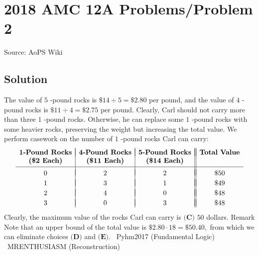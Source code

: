\documentclass[12pt]{article}
\begin{document}
\section*{{2018 AMC 12A Problems/Problem 2}}
Source: AoPS Wiki

\subsection*{Solution}
The value of $5$ -pound rocks is $\$14\div5=\$2.80$ per pound, and the value of $4$ -pound rocks is $\$11\div4=\$2.75$ per pound. Clearly, Carl should not carry more than three $1$ -pound rocks. Otherwise, he can replace some $1$ -pound rocks with some heavier rocks, preserving the weight but increasing the total value. We perform casework on the number of $1$ -pound rocks Carl can carry: \[\begin{array}{c|c|c||c} & & & \\ [-2.5ex] \boldsymbol{1}\textbf{-Pound Rocks} & \boldsymbol{4}\textbf{-Pound Rocks} & \boldsymbol{5}\textbf{-Pound Rocks} & \textbf{Total Value} \\ \textbf{(}\boldsymbol{\$2}\textbf{ Each)} & \textbf{(}\boldsymbol{\$11}\textbf{ Each)} & \textbf{(}\boldsymbol{\$14}\textbf{ Each)} & \\ [0.5ex] \hline & & & \\ [-2ex] 0 & 2 & 2 & \$50 \\ & & & \\ [-2.25ex] 1 & 3 & 1 & \$49 \\ & & & \\ [-2.25ex] 2 & 4 & 0 & \$48 \\ & & & \\ [-2.25ex] 3 & 0 & 3 & \$48 \end{array}\] Clearly, the maximum value of the rocks Carl can carry is $\boxed{\textbf{(C) } 50}$ dollars. Remark Note that an upper bound of the total value is $\$2.80\cdot18=\$50.40,$ from which we can eliminate choices $\textbf{(D)}$ and $\textbf{(E)}.$ ~Pyhm2017 (Fundamental Logic) ~MRENTHUSIASM (Reconstruction)
\end{document}
